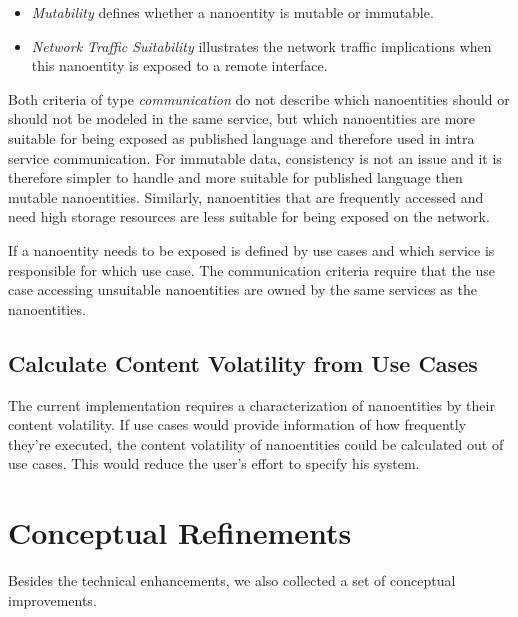 \begin{itemize}
\item \textit{Mutability} defines whether a nanoentity is mutable or immutable.
\item \textit{Network Traffic Suitability} illustrates the network traffic implications when this nanoentity is exposed to a remote interface.
\end{itemize}

Both criteria of type \textit{communication} do not describe which nanoentities should or should not be modeled in the same service, but which nanoentities are more suitable for being exposed as published language and therefore used in intra service communication. For immutable data, consistency is not an issue and it is therefore simpler to handle and more suitable for published language then mutable nanoentities. Similarly, nanoentities that are frequently accessed and need high storage resources are less suitable for being exposed on the network. 

If a nanoentity needs to be exposed is defined by use cases and which service is responsible for which use case. The communication criteria require that the use case accessing unsuitable nanoentities are owned by the same services as the nanoentities.


\subsection{Calculate Content Volatility from Use Cases}

The current implementation requires a characterization of nanoentities by their content volatility. If use cases would provide information of how frequently they're executed, the content volatility of nanoentities could be calculated out of use cases. This would reduce the user's effort to specify his system.

\section{Conceptual Refinements}

Besides the technical enhancements, we also collected a set of conceptual improvements.

